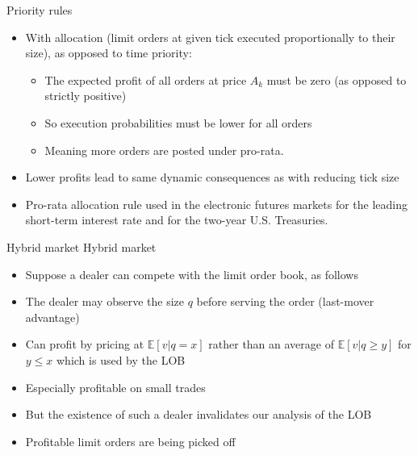\documentclass[english,10pt]{beamer}
\begin{document}
\begin{frame}{Priority rules}
	\begin{itemize}
		\item With  allocation (limit orders at given tick executed proportionally to their size), as opposed to \alert{time priority}:
		\begin{itemize}
			\item The expected profit of all orders at price $A_k$ must be zero (as opposed to strictly positive)
			\item So execution probabilities must be lower for all orders
			\item Meaning more orders are posted under pro-rata.
		\end{itemize}
		\item Lower profits lead to same dynamic consequences as with reducing tick size
		\item Pro-rata allocation rule used in the electronic futures markets for the leading short-term interest rate and for the two-year U.S. Treasuries.
	\end{itemize}
\end{frame}


\begin{frame}{Hybrid market}
	Hybrid market
	\begin{itemize}
		\item Suppose a dealer can compete with the limit order book, as follows
		\item The dealer may observe the size $q$ before serving the order (last-mover advantage)
		\item Can profit by pricing at $\mathbb{E}[v|q=x]$ rather than an average of $\mathbb{E}[v|q \geq y]$ for $y \leq x$ which is used by the LOB
		\item Especially profitable on small trades
		\item But the existence of such a dealer invalidates our analysis of the LOB
		\item Profitable limit orders are being picked off
	\end{itemize}
\end{frame}
\end{document}
